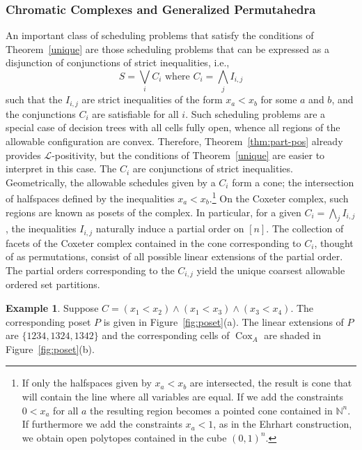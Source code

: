 \documentclass[12pt,reqno]{amsart}
\numberwithin{definition}{section}
\theoremstyle{definition}
\newtheorem{example}[definition]{Example}
\newcommand{\NN}{\mathbb{N}}
\newcommand{\cox}{\operatorname{Cox}}
\newcommand{\ncL}{\mathcal{L}}
\begin{document}
\subsubsection{Chromatic Complexes and Generalized Permutahedra}
An important class of scheduling problems that satisfy the conditions of Theorem~\ref{unique} are those scheduling problems that can be expressed as a disjunction of conjunctions of strict inequalities, i.e.,
\[
  S = \bigvee_i C_i \text{ where } C_i = \bigwedge_j I_{i,j}
\]
such that the $I_{i,j}$ are strict inequalities of the form $x_a <
x_b$ for some $a$ and $b$, and the conjunctions $C_i$ are satisfiable
for all $i$. Such
scheduling problems are a special case of
decision trees with all cells fully open, whence all regions of the allowable configuration are convex. Therefore, Theorem~\ref{thm:part-pos} already
provides $\ncL$-positivity, but the conditions of
Theorem~\ref{unique} are easier to interpret in this case.  The
$C_i$ are conjunctions of strict inequalities. Geometrically, the
allowable schedules given by a $C_i$ form a cone; the intersection of
halfspaces defined by the inequalities $x_a < x_b$.\footnote{If only the halfspaces given by $x_a < x_b$ are intersected, the result is cone that will contain the line where all variables are equal. If we add the constraints $0<x_a$ for all $a$ the resulting region becomes a pointed cone contained in $\NN^n$. If furthermore we add the constraints $x_a<1$, as in the Ehrhart construction, we obtain open polytopes contained in the cube $(0,1)^n$.}  On the Coxeter
complex, such regions are known as posets of the complex.  In particular, for a given $C_i =
\bigwedge_j I_{i,j}$, the inequalities $I_{i,j}$ naturally induce a
partial order on $[n]$.  The collection of facets of the Coxeter
complex contained in the cone corresponding to $C_i$, thought of as
permutations, consist of all possible linear extensions of the partial
order.  The partial orders corresponding to the $C_{i,j}$ yield the unique coarsest allowable ordered set partitions.


\begin{example}
Suppose $C = (x_1 < x_2) \wedge (x_1 < x_3) \wedge (x_3 < x_4)$.  The corresponding poset $P$ is given in Figure~\ref{fig:poset}(a).  The linear extensions of $P$ are $\{1234, 1324, 1342\}$ and the corresponding cells of $\cox_A$ are shaded in Figure~\ref{fig:poset}(b).
\end{example}
\end{document}
